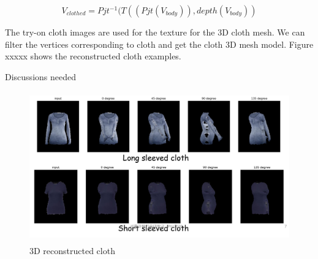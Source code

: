 \begin{equation}
V_{clothed} = Pjt^{-1} ( T( (Pjt(V_{body})), depth(V_{body}) )
\end{equation}


The try-on cloth images are used for the texture for the 3D cloth mesh. We can filter the vertices corresponding to cloth and get the cloth 3D mesh model. Figure xxxxx shows the reconstructed cloth examples. 


Discussions needed


\begin{figure}[t]
\centering
\includegraphics[height=6.5cm, scale=1]{figures/3dclothrecon.png}   %
\caption{3D reconstructed cloth}
\label{fig:3DreconstructedCloth}
\end{figure}



